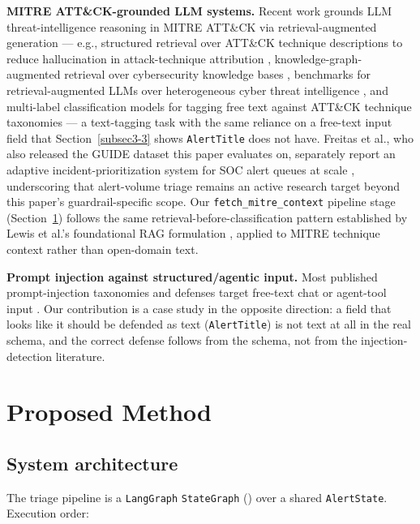 \documentclass[twocolumn]{svjour3}
\begin{document}
\noindent\textbf{MITRE ATT\&CK-grounded LLM systems.} Recent work grounds LLM threat-intelligence reasoning in MITRE ATT\&CK via retrieval-augmented generation --- e.g., structured retrieval over ATT\&CK technique descriptions to reduce hallucination in attack-technique attribution \cite{rag_cti2025}, knowledge-graph-augmented retrieval over cybersecurity knowledge bases \cite{kgagent2025}, benchmarks for retrieval-augmented LLMs over heterogeneous cyber threat intelligence \cite{cticonnect2025}, and multi-label classification models for tagging free text against ATT\&CK technique taxonomies \cite{mitre_texttag2026} --- a text-tagging task with the same reliance on a free-text input field that Section~\ref{subsec3-3} shows \texttt{AlertTitle} does not have. Freitas et al., who also released the GUIDE dataset \cite{guide2024} this paper evaluates on, separately report an adaptive incident-prioritization system for SOC alert queues at scale \cite{incident_prioritization2026}, underscoring that alert-volume triage remains an active research target beyond this paper's guardrail-specific scope. Our \texttt{fetch\_mitre\_context} pipeline stage (Section~\ref{sec3}) follows the same retrieval-before-classification pattern established by Lewis et al.'s foundational RAG formulation \cite{lewis_rag2020}, applied to MITRE technique context rather than open-domain text.

\noindent\textbf{Prompt injection against structured/agentic input.} Most published prompt-injection taxonomies and defenses target free-text chat or agent-tool input \cite{promptinjection_landscape2026,breaking_defenses2024,llm_privacy_survey2024}. Our contribution is a case study in the opposite direction: a field that looks like it should be defended as text (\texttt{AlertTitle}) is not text at all in the real schema, and the correct defense follows from the schema, not from the injection-detection literature.

\section{Proposed Method}\label{sec3}

\subsection{System architecture}\label{subsec3-1}
The triage pipeline is a \texttt{LangGraph} \texttt{StateGraph} \cite{langgraph2024} () over a shared \texttt{AlertState}. Execution order:
\end{document}

